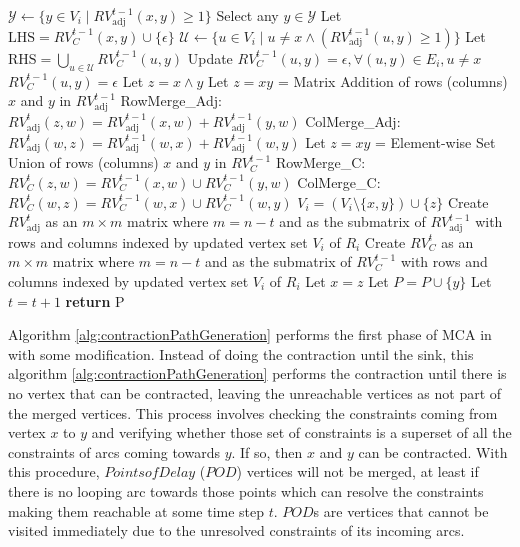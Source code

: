\begin{algorithm}[H]
\begin{algorithmic}[1]
        \State $\mathcal{Y} \leftarrow \{ y \in V_i \mid RV^{t-1}_{\text{adj}}(x,y) \geq 1 \}$
        \State Select any $y \in \mathcal{Y}$
        \State Let $\text{LHS} = RV^{t-1}_{C}(x,y) \cup \{\epsilon\}$
        \State $\mathcal{U} \leftarrow \{ u \in V_i \mid u \neq x \wedge (RV^{t-1}_{\text{adj}}(u,y) \geq 1) \}$
        \State Let $\text{RHS} = \bigcup_{u \in \mathcal{U}} RV^{t-1}_{C}(u,y)$
            \State Update $RV^{t-1}_{C}(u,y) = \epsilon, \forall (u,y) \in E_i, u \neq x$
                \State $RV^{t-1}_{C}(u,y) = \epsilon$
            \EndFor
            \State Let $z = x \land y$
            \State Let $z = xy$ = Matrix Addition of rows (columns) $x$ and $y$ in $RV^{t-1}_{\text{adj}}$
                \State RowMerge\_Adj: $RV^{t}_{\text{adj}}(z,w) = RV^{t-1}_{\text{adj}}(x,w) + RV^{t-1}_{\text{adj}}(y,w)$
                \State ColMerge\_Adj: $RV^{t}_{\text{adj}}(w,z) = RV^{t-1}_{\text{adj}}(w,x) + RV^{t-1}_{\text{adj}}(w,y)$
            \EndFor
            \State Let $z = xy$ = Element-wise Set Union of rows (columns) $x$ and $y$ in $RV^{t-1}_{C}$
                \State RowMerge\_C: $RV^{t}_{C}(z,w) = RV^{t-1}_{C}(x,w) \cup RV^{t-1}_{C}(y,w)$
                \State ColMerge\_C: $RV^{t}_{C}(w,z) = RV^{t-1}_{C}(w,x) \cup RV^{t-1}_{C}(w,y)$
            \EndFor
            \State $V_i = (V_i \setminus \{x,y\}) \cup \{z\}$
            \State Create $RV^{t}_{\text{adj}}$ as an $m \times m$ matrix where $m = n - t$ and as the submatrix of $RV^{t-1}_{\text{adj}}$ with rows and columns indexed by updated vertex set $V_i$ of $R_i$
            \State Create $RV^{t}_{C}$ as an $m \times m$ matrix where $m = n - t$ and as the submatrix of $RV^{t-1}_{C}$ with rows and columns indexed by updated vertex set $V_i$ of $R_i$
            \State Let $x = z$
            \State Let $P = P \cup \{y\}$
            \State Let $t = t + 1$
        \EndIf
    \EndWhile
    \State \textbf{return} P
    \end{algorithmic}
\end{algorithm}

Algorithm \ref{alg:contractionPathGeneration} performs the first phase of MCA in \cite{MalinaoJuayongScienggj2024} with some modification. Instead of doing the contraction until the sink, this algorithm \ref{alg:contractionPathGeneration} performs the contraction until there is no vertex that can be contracted, leaving the unreachable vertices as not part of the merged vertices. This process involves checking the constraints coming from vertex $x$ to $y$ and verifying whether those set of constraints is a superset of all the constraints of arcs coming towards $y$. If so, then $x$ and $y$ can be contracted. With this procedure, $Points of Delay$ ($POD$)\cite{Malinao2017} vertices will not be merged, at least if there is no looping arc towards those points which can resolve the constraints making them reachable at some time step $t$. $POD$s are vertices that cannot be visited immediately due to the unresolved constraints of its incoming arcs.


